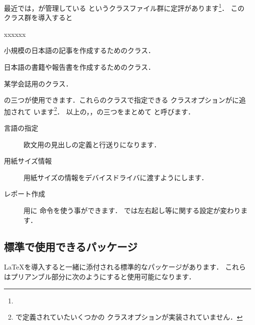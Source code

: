{最近では，が管理している
というクラスファイル群に定評があります\footnote{\webJsclasses}．
このクラス群を導入すると
\begin{namelist}{xxxxxx}
\item[\Cls{jsarticle}]	小規模の日本語の記事を作成するためのクラス．
\item[\Cls{jsbook}]	日本語の書籍や報告書を作成するためのクラス．
\item[\Cls{jspf}]	某学会誌用のクラス．
\end{namelist}
の三つが使用できます．これらのクラスで指定できる
クラスオプションがに追加されて
います\footnote{で定義されていたいくつかの
クラスオプションが実装されていません．}．
以上の，，の三つをまとめて
と呼びます．

\begin{description}
\item[]
\item[]
\item[言語の指定]
  欧文用の見出しの定義と行送りになります．
\item[用紙サイズ情報]  
  用紙サイズの情報をデバイスドライバに渡すようにします．
\item[レポート作成]  
  用に  命令を使う事ができます．
   では左右起し等に関する設定が変わります．
\end{description}

\subsection{標準で使用できるパッケージ}
{\LaTeX}を導入すると一緒に添付される標準的なパッケージがあります．
これらはプリアンブル部分に次のようにすると使用可能になります．
\begin{Syntax}
\end{Syntax}

}
